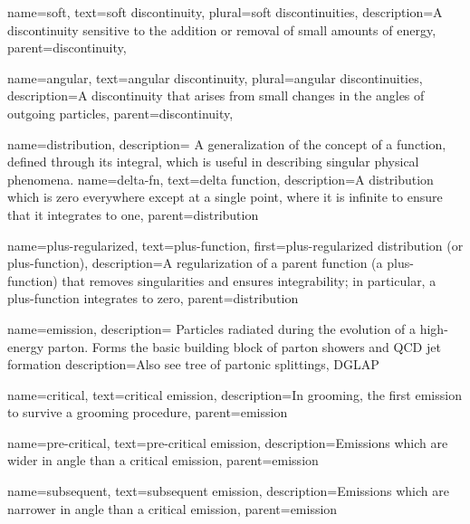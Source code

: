     {
        name=soft,
        text=soft discontinuity,
        plural=soft discontinuities,
        description={A discontinuity sensitive to the addition or removal of small amounts of energy},
        parent=discontinuity,
    }

    {
        name=angular,
        text={angular discontinuity},
        plural={angular discontinuities},
        description={A discontinuity that arises from small changes in the angles of outgoing particles},
        parent=discontinuity,
    }

{
    name=distribution,
    description={
        A generalization of the concept of a function, defined through its integral, which is useful in describing singular physical phenomena.
    }
}
    {
      name=delta-fn,
      text=delta function,
      description={A distribution which is zero everywhere except at a single point, where it is infinite to ensure that it integrates to one},
      parent=distribution
    }

    {
      name=plus-regularized,
      text=plus-function,
      first=plus-regularized distribution (or plus-function),
      description={A regularization of a parent function (a plus-function) that removes singularities and ensures integrability;
      in particular, a plus-function integrates to zero},
      parent=distribution
    }



{
    name=emission,
    description={
        Particles radiated during the evolution of a high-energy parton. Forms the basic building block of parton showers and QCD jet formation
    }
    description={Also see tree of partonic splittings, DGLAP}
}

    {
        name=critical,
        text=critical emission,
        description={In grooming, the first emission to survive a grooming procedure},
        parent=emission
    }

    {
        name=pre-critical,
        text=pre-critical emission,
        description={Emissions which are wider in angle than a critical emission},
        parent=emission
    }

    {
        name=subsequent,
        text=subsequent emission,
        description={Emissions which are narrower in angle than a critical emission},
        parent=emission
    }



